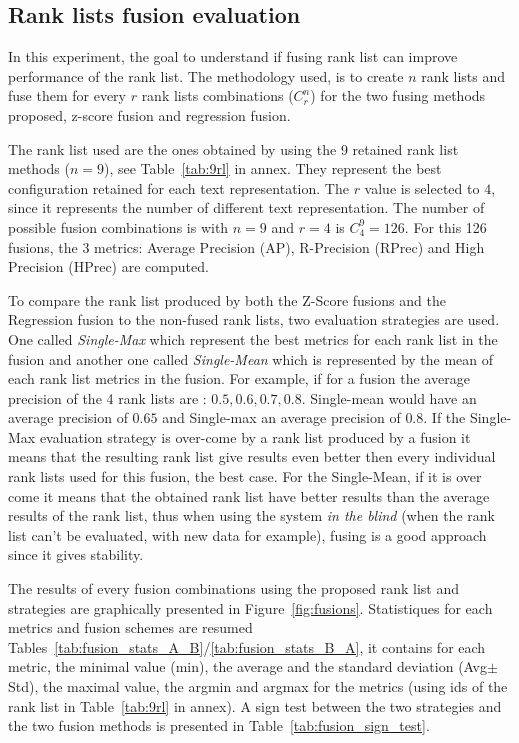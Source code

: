 \subsection{Rank lists fusion evaluation \label{sec:eval_fusion}}

In this experiment, the goal to understand if fusing rank list can improve performance of the rank list.
The methodology used, is to create $n$ rank lists and fuse them for every $r$ rank lists combinations ($C^n_r$) for the two fusing methods proposed, z-score fusion and regression fusion.

The rank list used are the ones obtained by using the 9 retained rank list methods ($n=9$), see Table~\ref{tab:9rl} in annex.
They represent the best configuration retained for each text representation.
The $r$ value is selected to $4$, since it represents the number of different text representation.
The number of possible fusion combinations is with $n=9$ and $r=4$ is $C^{9}_{4} = 126$.
For this 126 fusions, the 3 metrics: Average Precision (AP), R-Precision (RPrec) and High Precision (HPrec) are computed.

To compare the rank list produced by both the Z-Score fusions and the Regression fusion to the non-fused rank lists, two evaluation strategies are used.
One called \textit{Single-Max} which represent the best metrics for each rank list in the fusion and another one called \textit{Single-Mean} which is represented by the mean of each rank list metrics in the fusion.
For example, if for a fusion the average precision of the 4 rank lists are : $0.5, 0.6, 0.7, 0.8$. Single-mean would have an average precision of $0.65$ and Single-max an average precision of $0.8$.
If the Single-Max evaluation strategy is over-come by a rank list produced by a fusion it means that the resulting rank list give results even better then every individual rank lists used for this fusion, the best case.
For the Single-Mean, if it is over come it means that the obtained rank list have better results than the average results of the rank list, thus when using the system \textit{in the blind} (when the rank list can't be evaluated, with new data for example), fusing is a good approach since it gives stability.

The results of every fusion combinations using the proposed rank list and strategies are graphically presented in Figure~\ref{fig:fusions}.
Statistiques for each metrics and fusion schemes are resumed Tables~\ref{tab:fusion_stats_A_B}/\ref{tab:fusion_stats_B_A}, it contains for each metric, the minimal value (min), the average and the standard deviation (Avg$\pm$Std), the maximal value, the argmin and argmax for the metrics (using ids of the rank list in Table~\ref{tab:9rl} in annex).
A sign test between the two strategies and the two fusion methods is presented in Table~\ref{tab:fusion_sign_test}.

